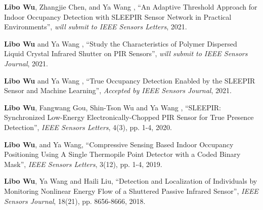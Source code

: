 

\begin{cvparagraph}

    \vspace{12pt}
    \begin{cvitems}
    \setlength{\itemsep}{2pt}
    \item{
        \textbf{Libo Wu}{, Zhangjie Chen, and Ya Wang , ``An Adaptive Threshold Approach for Indoor Occupancy Detection with SLEEPIR Sensor Network in Practical Environments'', \textit{will submit to IEEE Sensors Letters}, 2021.}}
     
    \item{
        \textbf{Libo Wu}{ and Ya Wang , ``Study the Characteristics of Polymer Dispersed Liquid Crystal Infrared Shutter on PIR Sensors'', \textit{will submit to IEEE Sensors Journal}, 2021.}}
      
    \item{
        \textbf{Libo Wu}{ and Ya Wang , ``True Occupancy Detection Enabled by the SLEEPIR Sensor and Machine Learning'', \textit{Accepted by IEEE Sensors Journal}, 2021.}}
      
    \item{
        \textbf{Libo Wu}{, Fangwang Gou, Shin-Tson Wu and Ya Wang , ``SLEEPIR: Synchronized Low-Energy Electronically-Chopped PIR Sensor for True Presence Detection'', \textit{IEEE Sensors Letters}, 4(3), pp. 1-4, 2020.}}
        
    \item{
        \textbf{Libo Wu}{, and Ya Wang, ``Compressive Sensing Based Indoor Occupancy Positioning Using A Single Thermopile Point Detector with a Coded Binary Mask'', \textit{IEEE Sensors Letters}, 3(12), pp. 1-4, 2019.}}
  
    \item{
        \textbf{Libo Wu}{, Ya Wang and Haili Liu, ``Detection and Localization of Individuals by Monitoring Nonlinear Energy Flow of a Shuttered Passive Infrared Sensor'', \textit{IEEE Sensors Journal}, 18(21), pp. 8656-8666, 2018.}}
  

\end{cvitems}
\end{cvparagraph}
